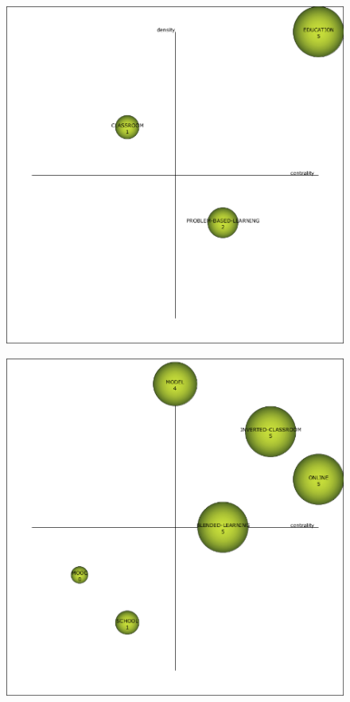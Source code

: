 \documentclass{textolivre}
\begin{document}
\begin{figure}[htbp]
 \begin{minipage}{.45\textwidth}
 \includegraphics[width=\textwidth]{Fig03a.png}
 \label{fig03a}
 \end{minipage}
 \hfill
 \begin{minipage}{.45\textwidth}
 \includegraphics[width=\textwidth]{Fig03b.png}

\end{minipage}
\end{figure}
\end{document}
